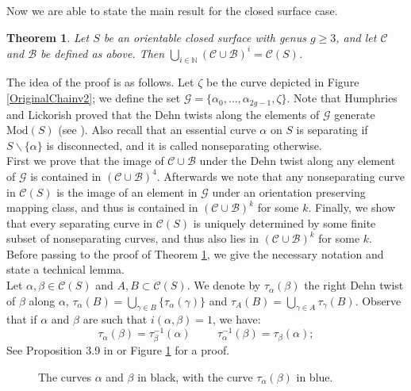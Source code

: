 \documentclass[twoside,11pt,a4paper]{article}
\newtheorem{Teo}[Def]{Theorem}
\newcommand*{\ccomp}[1]{\mathcal{C}(#1)}
\newcommand*{\Mod}[1]{\mathrm{Mod}(#1)}
\newcommand*{\nat}{\mathbb{N}}
\newcommand*{\Cf}{\mathscr{C}}
\newcommand*{\Bf}{\mathscr{B}}
\newcommand*{\Gf}{\mathscr{G}}
\begin{document}
\indent Now we are able to state the main result for the closed surface case.
\begin{Teo}\label{Thm2}
 Let $S$ be an orientable closed surface with genus $g \geq 3$, and let $\Cf$ and $\Bf$ be defined as above. Then $\bigcup_{i \in \nat} (\Cf \cup \Bf)^{i} = \ccomp{S}$.
\end{Teo}
\indent The idea of the proof is as follows. Let $\zeta$ be the curve depicted in Figure \ref{OriginalChainv2}; we define the set $\Gf = \{\alpha_{0}, \ldots, \alpha_{2g-1}, \zeta\}$. Note that Humphries and Lickorish proved that the Dehn twists along the elements of $\Gf$ generate $\Mod{S}$ (see \cite{Hump}). Also recall that an essential curve $\alpha$ on $S$ is separating if $S \backslash \{\alpha\}$ is disconnected, and it is called nonseparating otherwise.\\
\indent First we prove that the image of $\Cf \cup \Bf$ under the Dehn twist along any element of $\Gf$ is contained in $(\Cf \cup \Bf)^{4}$. Afterwards we note that any nonseparating curve in $\ccomp{S}$ is the image of an element in $\Gf$ under an orientation preserving mapping class, and thus is contained in $(\Cf \cup \Bf)^{k}$ for some $k$. Finally, we show that every separating curve in $\ccomp{S}$ is uniquely determined by some finite subset of nonseparating curves, and thus also lies in $(\Cf \cup \Bf)^{k}$ for some $k$.\\
\indent Before passing to the proof of Theorem \ref{Thm2}, we give the necessary notation and state a technical lemma.\\
\indent Let $\alpha, \beta \in \ccomp{S}$ and $A, B \subset \ccomp{S}$. We denote by $\tau_{\alpha}(\beta)$ the right Dehn twist of $\beta$ along $\alpha$, $\tau_{\alpha}(B) = \bigcup_{\gamma \in B} \{\tau_{\alpha}(\gamma)\}$ and $\tau_{A}(B) = \bigcup_{\gamma \in A} \tau_{\gamma}(B)$. Observe that if $\alpha$ and $\beta$ are such that $i(\alpha,\beta) = 1$, we have:
\begin{equation}\label{taupm} 
 \tau_{\alpha}(\beta) = \tau_{\beta}^{-1}(\alpha) \hspace{1cm} \tau_{\alpha}^{-1}(\beta) = \tau_{\beta}(\alpha);
\end{equation}
\indent See Proposition 3.9 in \cite{Ara2} or Figure \ref{DehnTwistEqFig} for a proof.\\
\begin{figure}
 \begin{center}
  \resizebox{9cm}{!}{}\caption{The curves $\alpha$ and $\beta$ in black, with the curve $\tau_{\alpha}(\beta)$ in blue.}\label{DehnTwistEqFig}
 \end{center}
\end{figure}
\end{document}
